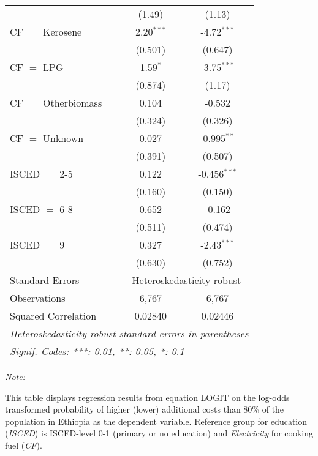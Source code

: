 \begin{table}[htbp!]
\begin{adjustbox}{width = 1\textwidth, max height = 0.95\textheight, center}
\begin{threeparttable}[b]
\begin{tabular}{lcc}
                                 & (1.49)         & (1.13)\\   
            CF $=$ Kerosene      & 2.20$^{***}$   & -4.72$^{***}$\\   
                                 & (0.501)        & (0.647)\\   
            CF $=$ LPG           & 1.59$^{*}$     & -3.75$^{***}$\\   
                                 & (0.874)        & (1.17)\\   
            CF $=$ Otherbiomass  & 0.104          & -0.532\\   
                                 & (0.324)        & (0.326)\\   
            CF $=$ Unknown       & 0.027          & -0.995$^{**}$\\   
                                 & (0.391)        & (0.507)\\   
            ISCED $=$ 2-5        & 0.122          & -0.456$^{***}$\\   
                                 & (0.160)        & (0.150)\\   
            ISCED $=$ 6-8        & 0.652          & -0.162\\   
                                 & (0.511)        & (0.474)\\   
            ISCED $=$ 9          & 0.327          & -2.43$^{***}$\\   
                                 & (0.630)        & (0.752)\\   
            \midrule 
            Standard-Errors & \multicolumn{2}{c}{Heteroskedasticity-robust} \\ 
            Observations         & 6,767          & 6,767\\  
            Squared Correlation  & 0.02840        & 0.02446\\  
            \midrule \midrule
            \multicolumn{3}{l}{\emph{Heteroskedasticity-robust standard-errors in parentheses}}\\
            \multicolumn{3}{l}{\emph{Signif. Codes: ***: 0.01, **: 0.05, *: 0.1}}\\
         \end{tabular}
         
         \begin{tablenotes}\item \medskip \textit{Note:}
            \item This table displays regression results from equation LOGIT on the log-odds transformed probability of higher (lower) additional costs than 80\% of the population in Ethiopia as the dependent variable. Reference group for education (\textit{ISCED}) is ISCED-level 0-1 (primary or no education) and \textit{Electricity} for cooking fuel (\textit{CF}).
         \end{tablenotes}
      \end{threeparttable}
   \end{adjustbox}
\end{table}


